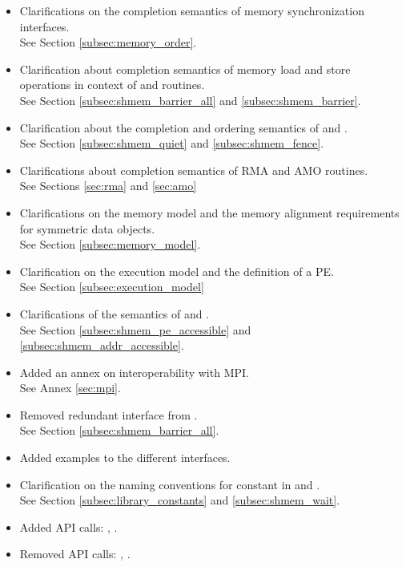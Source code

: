 \begin{itemize}
\item Clarifications on the completion semantics of memory synchronization 
interfaces.\\See Section \ref{subsec:memory_order}.
\item Clarification about completion semantics of memory load and store 
operations in context of  and  
routines.\\See Section \ref{subsec:shmem_barrier_all} and \ref{subsec:shmem_barrier}.
\item Clarification about the completion and ordering semantics of  and .
\\See Section \ref{subsec:shmem_quiet} and \ref{subsec:shmem_fence}.
\item Clarifications about completion semantics of \ac{RMA} and \ac{AMO} routines.
\\See Sections \ref{sec:rma} and \ref{sec:amo}
\item Clarifications on the memory model and the memory alignment requirements for symmetric data objects.
\\See Section \ref{subsec:memory_model}.
\item Clarification on the execution model and the definition of a \ac{PE}.
\\See Section \ref{subsec:execution_model}
\item Clarifications of the semantics of  and .
\\See Section \ref{subsec:shmem_pe_accessible} and \ref{subsec:shmem_addr_accessible}.
\item Added an annex on interoperability with \ac{MPI}.\\See Annex \ref{sec:mpi}.
\item Removed redundant interface  from .\\See Section \ref{subsec:shmem_barrier_all}.
\item Added examples to the different interfaces.
\item Clarification on the naming conventions for constant in \Clang{} and \Fortran{}.
\\See Section \ref{subsec:library_constants} and \ref{subsec:shmem_wait}.
\item Added \ac{API} calls: , . 
\item Removed \ac{API} calls: , . 
\end{itemize}
